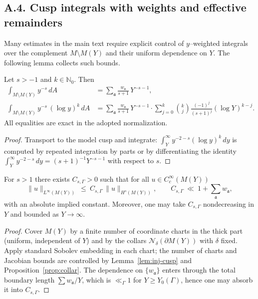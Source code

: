 \subsection*{A.4. Cusp integrals with weights and effective remainders}

\noindent
Many estimates in the main text require explicit control of $y$–weighted
integrals over the complement $M\setminus M(Y)$ and their uniform dependence on
$Y$. The following lemma collects such bounds.

\begin{lemma}\label{lem:weighted-tails}
Let $s>-1$ and $k\in\mathbb N_0$. Then
\begin{align}
\int_{M\setminus M(Y)} y^{-s}\,dA
&=\sum_{\mathfrak a}\frac{w_{\mathfrak a}}{s+1}\,Y^{-s-1},\label{eq:weighted-tail}\\
\int_{M\setminus M(Y)} y^{-s}\,(\log y)^k\,dA
&=\sum_{\mathfrak a}\frac{w_{\mathfrak a}}{s+1}\,Y^{-s-1}\cdot
\sum_{j=0}^{k}\binom{k}{j}\frac{(-1)^j}{(s+1)^j}(\log Y)^{k-j}.\label{eq:log-tail}
\end{align}
All equalities are exact in the adopted normalization.
\end{lemma}

\begin{proof}
Transport to the model cusp and integrate:
$\int_Y^\infty y^{-2-s}(\log y)^k\,dy$ is computed by repeated integration by
parts or by differentiating the identity
$\int_Y^\infty y^{-2-s}\,dy=(s+1)^{-1}Y^{-s-1}$ with respect to $s$.
\end{proof}

\begin{corollary}\label{cor:sobolev}
For $s>1$ there exists $C_{s,\Gamma}>0$ such that for all $u\in C_c^\infty(M(Y))$
\[
\|u\|_{L^\infty(M(Y))}\ \le\ C_{s,\Gamma}\,\|u\|_{H^s(M(Y))},
\qquad
C_{s,\Gamma}\ \ll\ 1+\sum_{\mathfrak a} w_{\mathfrak a},
\]
with an absolute implied constant. Moreover, one may take $C_{s,\Gamma}$ nondecreasing
in $Y$ and bounded as $Y\to\infty$.
\end{corollary}

\begin{proof}
Cover $M(Y)$ by a finite number of coordinate charts in the thick part (uniform,
independent of $Y$) and by the collars $\mathcal N_{\delta}(\partial M(Y))$
with $\delta$ fixed. Apply standard Sobolev embedding in each chart; the number
of charts and Jacobian bounds are controlled by Lemma~\ref{lem:inj-cusp} and
Proposition~\ref{prop:collar}. The dependence on $\{w_{\mathfrak a}\}$ enters
through the total boundary length $\sum w_{\mathfrak a}/Y$, which is $\ll_\Gamma 1$
for $Y\ge Y_0(\Gamma)$, hence one may absorb it into $C_{s,\Gamma}$.
\end{proof}

